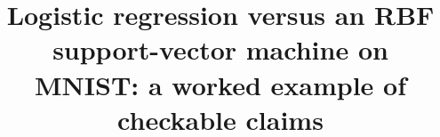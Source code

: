 \newcommand{\scitexmanuscripttitle}{%
Logistic regression versus an RBF support-vector machine on MNIST:
a worked example of checkable claims
}
\title{\scitexmanuscripttitle}

